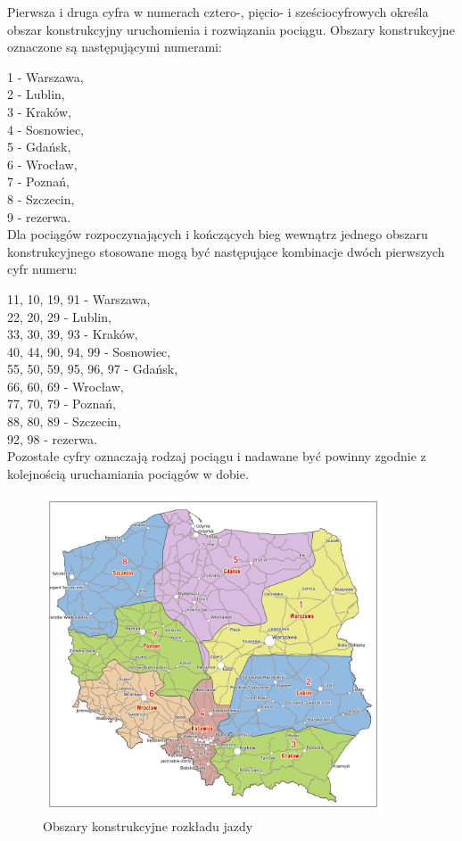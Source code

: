 Pierwsza i druga cyfra w numerach cztero-, pięcio- i sześciocyf­rowych określa obszar konstruk­cyjny urucho­mienia i rozwią­zania pociągu. Obszary konstruk­cyjne ozna­czone są nastę­pują­cymi numerami:

1 - Warszawa,\\
2 - Lublin,\\
3 - Kraków,\\
4 - Sosnowiec,\\
5 - Gdańsk,\\
6 - Wrocław,\\
7 - Poznań,\\
8 - Szczecin,\\
9 - rezerwa.\\

Dla pociągów rozpoczyna­jących i kończących bieg wewnątrz jednego obszaru konstrukcyj­nego stoso­wane mogą być następu­jące kombi­nacje dwóch pierwszych cyfr numeru:

11, 10, 19, 91 - Warszawa,\\
22, 20, 29 - Lublin,\\
33, 30, 39, 93 - Kraków,\\
40, 44, 90, 94, 99 - Sosnowiec,\\
55, 50, 59, 95, 96, 97 - Gdańsk,\\
66, 60, 69 - Wrocław,\\
77, 70, 79 - Poznań,\\
88, 80, 89 - Szczecin,\\
92, 98 - rezerwa.\\
Pozostałe cyfry ozna­czają rodzaj pociągu i nada­wane być powinny zgodnie z kolej­nością urucha­miania pociągów w dobie.
\begin{figure}
	\includegraphics[width=0.9\textwidth]{skryptkierownik-img/obszary-konstrukcyjne.png}	
	\caption{Obszary konstrukcyjne rozkładu jazdy}
\end{figure}


